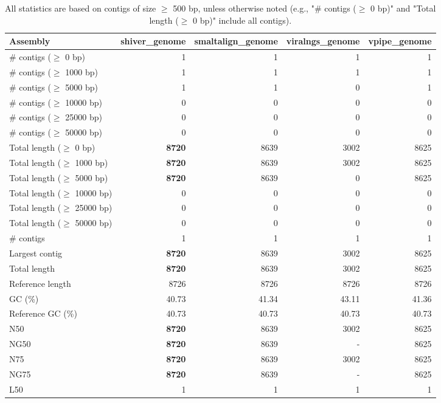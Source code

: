 \documentclass[12pt,a4paper]{article}
\begin{document}
\begin{table}[ht]
\begin{center}
\caption{All statistics are based on contigs of size $\geq$ 500 bp, unless otherwise noted (e.g., "\# contigs ($\geq$ 0 bp)" and "Total length ($\geq$ 0 bp)" include all contigs).}
\begin{tabular}{|l*{4}{|r}|}
\hline
Assembly & shiver\_genome & smaltalign\_genome & viralngs\_genome & vpipe\_genome \\ \hline
\# contigs ($\geq$ 0 bp) & 1 & 1 & 1 & 1 \\ \hline
\# contigs ($\geq$ 1000 bp) & 1 & 1 & 1 & 1 \\ \hline
\# contigs ($\geq$ 5000 bp) & 1 & 1 & 0 & 1 \\ \hline
\# contigs ($\geq$ 10000 bp) & 0 & 0 & 0 & 0 \\ \hline
\# contigs ($\geq$ 25000 bp) & 0 & 0 & 0 & 0 \\ \hline
\# contigs ($\geq$ 50000 bp) & 0 & 0 & 0 & 0 \\ \hline
Total length ($\geq$ 0 bp) & {\bf 8720} & 8639 & 3002 & 8625 \\ \hline
Total length ($\geq$ 1000 bp) & {\bf 8720} & 8639 & 3002 & 8625 \\ \hline
Total length ($\geq$ 5000 bp) & {\bf 8720} & 8639 & 0 & 8625 \\ \hline
Total length ($\geq$ 10000 bp) & 0 & 0 & 0 & 0 \\ \hline
Total length ($\geq$ 25000 bp) & 0 & 0 & 0 & 0 \\ \hline
Total length ($\geq$ 50000 bp) & 0 & 0 & 0 & 0 \\ \hline
\# contigs & 1 & 1 & 1 & 1 \\ \hline
Largest contig & {\bf 8720} & 8639 & 3002 & 8625 \\ \hline
Total length & {\bf 8720} & 8639 & 3002 & 8625 \\ \hline
Reference length & 8726 & 8726 & 8726 & 8726 \\ \hline
GC (\%) & 40.73 & 41.34 & 43.11 & 41.36 \\ \hline
Reference GC (\%) & 40.73 & 40.73 & 40.73 & 40.73 \\ \hline
N50 & {\bf 8720} & 8639 & 3002 & 8625 \\ \hline
NG50 & {\bf 8720} & 8639 & - & 8625 \\ \hline
N75 & {\bf 8720} & 8639 & 3002 & 8625 \\ \hline
NG75 & {\bf 8720} & 8639 & - & 8625 \\ \hline
L50 & 1 & 1 & 1 & 1 \\ \hline

\end{tabular}
\end{center}
\end{table}
\end{document}
